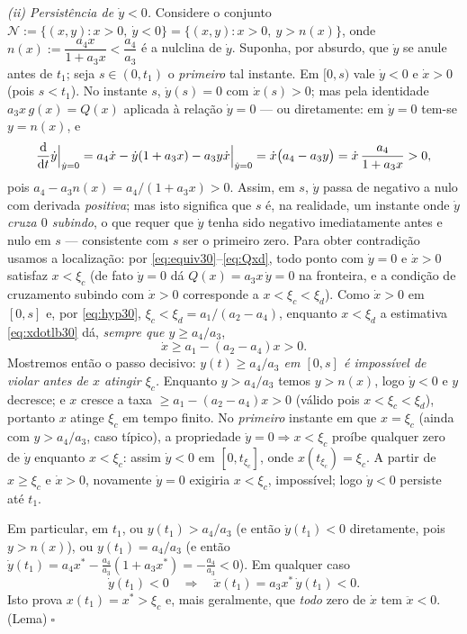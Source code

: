 \begin{enumerate}[label=(\alph*)]
\emph{(ii) Persistência de $\dot y<0$.} Considere o conjunto $\mathcal N:=\{(x,y):x>0,\ \dot y<0\}=\{(x,y):x>0,\ y>n(x)\}$, onde $n(x):=\dfrac{a_4x}{1+a_3x}<\dfrac{a_4}{a_3}$ é a nulclina de $\dot y$. Suponha, por absurdo, que $\dot y$ se anule antes de $t_1$; seja $s\in(0,t_1)$ o \emph{primeiro} tal instante. Em $[0,s)$ vale $\dot y<0$ e $\dot x>0$ (pois $s<t_1$). No instante $s$, $\dot y(s)=0$ com $\dot x(s)>0$; mas pela identidade $a_3x\,g(x)=Q(x)$ aplicada à relação $\dot y=0$ — ou diretamente: em $\dot y=0$ tem-se $y=n(x)$, e
\[
\frac{\mathrm{d}}{\mathrm{d} t}\dot y\Big|_{\dot y=0}=a_4\dot x-\dot y(1+a_3x)-a_3y\dot x\Big|_{\dot y=0}
=\dot x\big(a_4-a_3y\big)=\dot x\,\frac{a_4}{1+a_3x}>0,
\]
pois $a_4-a_3n(x)=a_4/(1+a_3x)>0$. Assim, em $s$, $\dot y$ passa de negativo a nulo com derivada \emph{positiva}; mas isto significa que $s$ é, na realidade, um instante onde $\dot y$ \emph{cruza $0$ subindo}, o que requer que $\dot y$ tenha sido negativo imediatamente antes e nulo em $s$ --- consistente com $s$ ser o primeiro zero. Para obter contradição usamos a localização: por \eqref{eq:equiv30}--\eqref{eq:Qxd}, todo ponto com $\dot y=0$ e $\dot x>0$ satisfaz $x<\xi_c$ (de fato $\dot y=0$ dá $Q(x)=a_3x\,\dot y=0$ na fronteira, e a condição de cruzamento subindo com $\dot x>0$ corresponde a $x<\xi_c<\xi_d$). Como $\dot x>0$ em $[0,s]$ e, por \eqref{eq:hyp30}, $\xi_c<\xi_d=a_1/(a_2-a_4)$, enquanto $x<\xi_d$ a estimativa \eqref{eq:xdotlb30} dá, \emph{sempre que $y\ge a_4/a_3$},
\[
\dot x\ge a_1-(a_2-a_4)x>0 .
\]
Mostremos então o passo decisivo: \emph{$y(t)\ge a_4/a_3$ em $[0,s]$ é impossível de violar antes de $x$ atingir $\xi_c$.} Enquanto $y>a_4/a_3$ temos $y>n(x)$, logo $\dot y<0$ e $y$ decresce; e $x$ cresce a taxa $\ge a_1-(a_2-a_4)x>0$ (válido pois $x<\xi_c<\xi_d$), portanto $x$ atinge $\xi_c$ em tempo finito. No \emph{primeiro} instante em que $x=\xi_c$ (ainda com $y>a_4/a_3$, caso típico), a propriedade $\dot y=0\Rightarrow x<\xi_c$ proíbe qualquer zero de $\dot y$ enquanto $x<\xi_c$: assim $\dot y<0$ em $[0,t_{\xi_c}]$, onde $x(t_{\xi_c})=\xi_c$. A partir de $x\ge\xi_c$ e $\dot x>0$, novamente $\dot y=0$ exigiria $x<\xi_c$, impossível; logo $\dot y<0$ persiste até $t_1$.

Em particular, em $t_1$, ou $y(t_1)>a_4/a_3$ (e então $\dot y(t_1)<0$ diretamente, pois $y>n(x)$), ou $y(t_1)=a_4/a_3$ (e então $\dot y(t_1)=a_4x^*-\tfrac{a_4}{a_3}(1+a_3x^*)=-\tfrac{a_4}{a_3}<0$). Em qualquer caso
\[
\dot y(t_1)<0\quad\Longrightarrow\quad \ddot x(t_1)=a_3x^*\,\dot y(t_1)<0 .
\]
Isto prova $x(t_1)=x^*>\xi_c$ e, mais geralmente, que \emph{todo} zero de $\dot x$ tem $\ddot x<0$.\hfill(Lema)$\;\square$


\end{enumerate}
